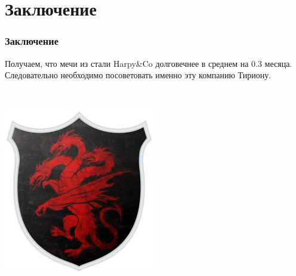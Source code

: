 \documentclass{beamer}
\begin{document}
\section{Заключение}

\begin{frame}
    \frametitle{Заключение}
    
    Получаем, что мечи из стали Harpy\&Co долговечнее в среднем на 0.3 месяца. Следовательно необходимо посоветовать именно эту компанию Тириону.
    
    \
    
    \includegraphics[scale = 0.4]{Targaryen.png}
\end{frame}
\end{document}
